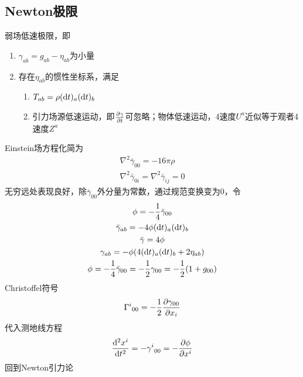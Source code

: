 \subsection{Newton极限}

弱场低速极限，即
\begin{enumerate}
    \item $\gamma_{ab}=g_{ab}-\eta_{ab}$为小量
    \item 存在$\eta_{ab}$的惯性坐标系，满足
    \begin{enumerate}
        \item $T_{ab}=\rho(\mathrm{d} t)_a (\mathrm{d} t)_b$
        \item 引力场源低速运动，即$\frac{\partial \gamma}{\partial t}$可忽略；物体低速运动，4速度$U^a$近似等于观者4速度$Z^a$
    \end{enumerate}
\end{enumerate}
Einstein场方程化简为
\begin{gather*}
    \nabla^2 \bar{\gamma}_{00}=-16\pi \rho
    \\
    \nabla^2 \bar{\gamma}_{0i}=\nabla^2 \bar{\gamma}_{ij}=0
\end{gather*}
无穷远处表现良好，除$\bar{\gamma}_{00}$外分量为常数，通过规范变换变为$0$，令
\begin{gather*}
    \phi=-\frac{1}{4}\bar{\gamma}_{00}
    \\
    \bar{\gamma}_{ab}=-4\phi(\mathrm{d} t)_a (\mathrm{d} t)_b
    \\
    \bar{\gamma}=4\phi
    \\
    \gamma_{ab}=-\phi(4(\mathrm{d} t)_a (\mathrm{d} t)_b+2\eta_{ab})
    \\
    \phi=-\frac{1}{4}\bar{\gamma}_{00}=-\frac{1}{2}\gamma_{00}=-\frac{1}{2}(1+g_{00})
\end{gather*}
Christoffel符号
\begin{gather*}
    {\Gamma^i}_{00}=-\frac{1}{2}\frac{\partial \gamma_{00}}{\partial x_i}
\end{gather*}
代入测地线方程
\begin{gather*}
    \frac{\mathrm{d} ^2 x^i}{\mathrm{d} t^2}=-{\gamma^i}_{00}=-\frac{\partial \phi}{\partial x^i}
\end{gather*}
回到Newton引力论